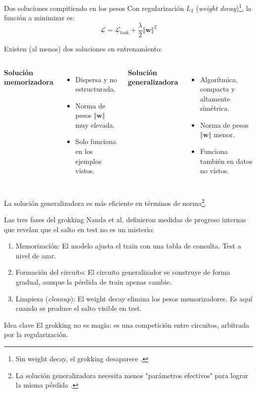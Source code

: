 \begin{frame}{Dos soluciones compitiendo en los pesos}
Con regularización $L_2$ (\textit{weight decay})\footnote{Sin weight decay, el grokking desaparece \cite{power2022grokking,liu2022omnigrok}.}, la función a minimizar es:
\begin{equation}
\mathcal{L} = \mathcal{L}_{\text{task}} + \frac{\lambda}{2}\Vert \mathbf{w} \Vert^2
\end{equation}

Existen (al menos) dos soluciones en entrenamiento:
\vspace{0.25cm}
\begin{columns}
\textbf{\alert{Solución memorizadora}}
\begin{itemize}
    \item Dispersa y no estructurada.
    \item Norma de pesos $\Vert \mathbf{w} \Vert$ \alert{muy elevada}.
    \item Solo funciona en los ejemplos vistos.
\end{itemize}
 
\textbf{\alert{Solución generalizadora}}
\begin{itemize}
    \item Algorítmica, compacta y altamente simétrica.
    \item Norma de pesos $\Vert \mathbf{w} \Vert$ \alert{menor}.
    \item Funciona también en datos no vistos.
\end{itemize}
\end{columns}

La solución generalizadora es \alert{más eficiente} en términos de norma\footnote{La solución generalizadora necesita menos "parámetros efectivos" para lograr la misma pérdida \cite{varma2023explaining}.}.
\end{frame}
 
\begin{frame}{Las tres fases del grokking}
Nanda et al. \cite{nanda2023progress} definieron \alert{medidas de progreso} internas que revelan que el salto en test no es un misterio:
 
\begin{enumerate}
    \item \alert{Memorización:} El modelo ajusta el train con una tabla de consulta. Test a nivel de azar.
    \item \alert{Formación del circuito:} El circuito generalizador se construye de forma \alert{gradual}, aunque la pérdida de train apenas cambie.
    \item \alert{Limpieza (\textit{cleanup}):} El weight decay elimina los pesos memorizadores. Es aquí cuando se produce el \alert{salto visible} en test.
\end{enumerate}

\begin{block}{Idea clave}
\vspace{0.25cm}
El grokking no es magia: es una \alert{competición} entre circuitos, arbitrada por la regularización.
\end{block}
\end{frame}

